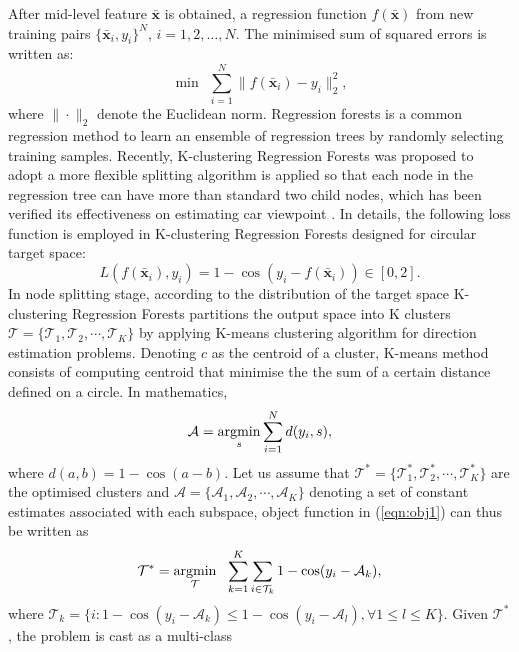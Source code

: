 \documentclass{tutmscthesis}[2010/09/22]
\numberwithin{equation}{section}
\numberwithin{table}{section}
\numberwithin{figure}{section}
\renewcommand{\vec}[1]{\bm{#1}}
\newcommand{\argmin}{\operatornamewithlimits{argmin}}
\begin{document}
After mid-level feature  $\bar{\vec{x}}$ is obtained, a regression function $f(\bar{\vec{x}})$ from new training pairs $\{\bar{\vec{x}}_i, y_i\}^N$, $i=1, 2, \ldots, N$. The minimised sum of squared errors is written as:
\begin{equation}
\min ~~\sum_{i=1}^N \|f(\bar{\vec{x}}_i)-y_i\|_2^2,\label{eqn:obj1}
\end{equation}
where $\|\cdot\|_2$ denote the Euclidean norm. 
Regression forests \cite{} is a common regression method to learn an ensemble of regression trees by randomly selecting training samples.
Recently, K-clustering Regression Forests was proposed to adopt a more flexible splitting algorithm is applied so that each node in the regression tree can have more than standard two child nodes, which has been verified its effectiveness on estimating car viewpoint \cite{}.
In details, the following loss function is employed in K-clustering Regression Forests designed for circular target space:
\begin{equation}
L(f(\bar{\vec{x}}_i),y_i) = 1 - \cos(y_i-f(\bar{\vec{x}}_i))\in [0,2].
\end{equation}
In node splitting stage, according to the distribution of the target space K-clustering Regression Forests partitions the output space into K clusters $\mathcal{T} = \{\mathcal{T}_1,\mathcal{T}_2,\cdots,\mathcal{T}_K\}$ by applying K-means clustering algorithm \cite{hara2014growing} for direction estimation problems. 
Denoting $c$ as the centroid of a cluster, K-means method consists of computing centroid that minimise the the sum of a certain distance defined on a circle.
In mathematics, 
\begin{equation}
\mathcal{A} = \argmin_s\sum_{i=1}^{N}d(y_i,s),
\end{equation}
where $d(a,b)=1-\cos(a-b)$.
Let us assume that $\mathcal{T}^* = \{\mathcal{T}_1^*,
\mathcal{T}_2^*, \cdots, \mathcal{T}_K^*\}$ are the optimised clusters
and  $\mathcal{A} = \{\mathcal{A}_1, \mathcal{A}_2, \cdots,
\mathcal{A}_K\}$ denoting a set of constant estimates associated with
each subspace, object function in (\ref{eqn:obj1}) can thus be written
as  
\begin{equation}
\mathcal{T}^* = \argmin_{\mathcal{T}} ~~\sum_{k=1}^K\sum_{i\in \mathcal{T}_k} 1 - \cos(y_i-\mathcal{A}_k),\label{eqn:obj_circular}
\end{equation}
where $\mathcal{T}_k=\{i: 1- \cos(y_i-\mathcal{A}_k)\leqslant 1- \cos(y_i-\mathcal{A}_l), \forall 1\leqslant l \leqslant K \}$. 
Given $\mathcal{T}^*$, the problem is cast as a multi-class
\end{document}
